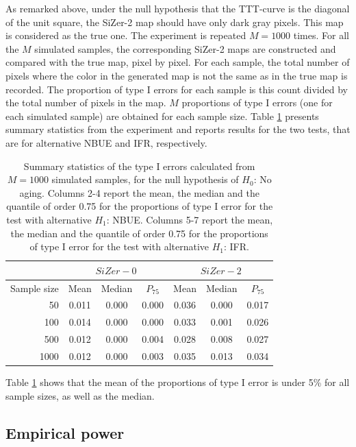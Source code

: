 \documentclass[preprint,12pt]{elsarticle}
\begin{document}
As remarked above, under the null hypothesis that the TTT-curve is the diagonal of the unit square, the SiZer-2 map  should have only dark gray pixels. This map is considered as the true one. The experiment is repeated $M=1000$ times.  For all the $M$ simulated samples, the corresponding SiZer-2 maps are constructed  and compared with the true map, pixel by pixel. For each sample,  the total number of pixels where the color in the generated map is not the same as in the true map is recorded. The proportion of type I errors for each sample is this count divided by the total number of pixels in the map.  $M$ proportions of type I errors (one for each simulated sample) are obtained for each sample size. Table \ref{Tab:errorI} presents summary statistics from the experiment and reports results for the two tests, that are for alternative NBUE and IFR, respectively. 


\begin{table}[htb]
\centering
\caption{Summary statistics of the type I errors calculated from $M=1000$ simulated samples, for the null hypothesis of $ H_0$: No aging. Columns 2-4 report the mean, the median and the quantile of order 0.75 for the proportions of type I error for the test with alternative $H_1$: NBUE.  Columns 5-7 report the mean, the median and the quantile of order 0.75 for the proportions of type I error for the test with alternative $H_1$: IFR.}
{\begin{tabular}{r|ccc|ccc}
               & \multicolumn{3}{|c|}{$SiZer-0$}& \multicolumn{3}{c|}{$SiZer-2$} \\ \hline
   Sample size & Mean &   Median & $P_{75}$ &  Mean &   Median & $P_{75}$  \\ \hline
       50      &  0.011 &0.000 &0.000 &   0.036 & 0.000 & 0.017  \\
      100      &  0.014 &0.000 &0.000 &   0.033 & 0.001 & 0.026  \\
     500       &  0.012 &0.000 &0.004 &   0.028 & 0.008 & 0.027 \\
     1000      &  0.012 &0.000 &0.003 &   0.035 & 0.013 & 0.034 \\ \hline
\end{tabular}}
\label{Tab:errorI}
\end{table}
 Table \ref{Tab:errorI}  shows that the mean of the proportions of type  I error is under 5\% for all sample sizes, as well as the median.

\subsection{Empirical power}
\end{document}
